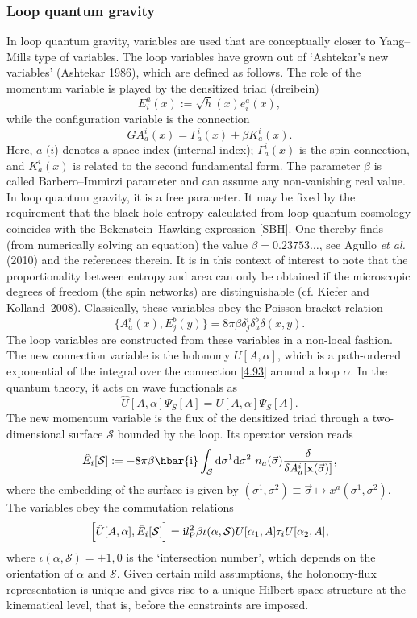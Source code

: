 \documentclass[12pt,a4paper]{article}
\newcommand{\be}{\begin{equation}}
\newcommand{\ee}{\end{equation}}
\newcommand{\lb}{\label}
\newcommand{\bdm}{\begin{displaymath}}
\newcommand{\edm}{\end{displaymath}}
\newcommand{\D}{{\rm d}}
\newcommand{\I}{{\rm i}}
\newcommand{\X}{{\mathbf x}}
\begin{document}
\subsubsection{Loop quantum gravity}

In loop quantum gravity, variables are used 
that are conceptually closer to Yang--Mills type of
variables. 
The loop variables have grown out of `Ashtekar's new variables'
(Ashtekar 1986), which
are defined as follows.
The role of the momentum variable 
is played by the densitized triad (dreibein)
\be
\lb{4.79}
E^a_i(x):=\sqrt{h}(x)e^a_i(x),
\ee
while the configuration variable is the connection
\be
\lb{4.93}
GA^i_a(x)=\Gamma^i_a(x)+\beta K^i_a(x).
\ee
Here, $a$ ($i$) denotes a space index (internal index);
$\Gamma^i_a(x)$ is the spin connection, and $K^i_a(x)$ is related to
the second fundamental form. The parameter $\beta$ is called
Barbero--Immirzi parameter and can assume any non-vanishing real
value. In loop quantum gravity, it is a free parameter. It may be
fixed by the requirement that the black-hole entropy calculated from
loop quantum cosmology coincides with the Bekenstein--Hawking
expression \eqref{SBH}. One thereby finds (from numerically solving an
equation) the
value $\beta=0.23753\ldots$, see Agullo {\em et al.} (2010) and the
references therein. It is in this context of interest to note that the
proportionality between entropy and area can only be obtained if the
microscopic degrees of freedom (the spin networks) are distinguishable 
(cf. Kiefer and Kolland~2008).
Classically, these variables obey the Poisson-bracket relation
\be
\lb{4.94}
\{A^i_a(x),E^b_j(y)\}=8\pi\beta\delta^i_j\delta^b_a\delta(x,y).
\ee
The loop variables are constructed from these variables in a non-local
fashion. The new connection variable is the holonomy $U[A,\alpha]$,
which is a path-ordered exponential of the integral over the
connection \eqref{4.93} around a loop $\alpha$. In the quantum theory,
it acts on wave functionals as
\be
\lb{6.20}
\hat{U}[A,\alpha]\Psi_S[A]= U[A,\alpha]\Psi_S[A].
\ee
The new momentum variable is the flux of the densitized triad through
a two-dimensional surface ${\mathcal S}$ 
bounded by the loop. Its operator version reads
\be
\lb{6.21}
\hat{E}_i[{\mathcal S}]:= -8\pi\beta\hbar\I\int_{\mathcal S}\D\sigma^1
\D\sigma^2\ n_a(\vec{\sigma})\frac{\delta}{\delta A^i_a[\X(\vec{\sigma})]},
\ee
where the embedding of the surface is given by
$(\sigma^1,\sigma^2)\equiv\vec{\sigma} 
\mapsto x^a(\sigma^1,\sigma^2)$. 
The variables obey the commutation relations
\bdm
\left[\hat{U}[A,\alpha],\hat{E}_i[{\mathcal S}]\right]
=\I l_{\rm P}^2\beta\iota(\alpha,{\mathcal S})U[\alpha_1,A]\tau_i
U[\alpha_2,A],
\edm
where $\iota(\alpha,{\mathcal S})=\pm 1, 0$ is the `intersection number',
which depends on the orientation of $\alpha$ and ${\mathcal S}$.
Given certain mild assumptions, the holonomy-flux representation is
unique and gives rise to a unique Hilbert-space structure at the
kinematical level, that is, before the constraints are imposed. 
\end{document}
